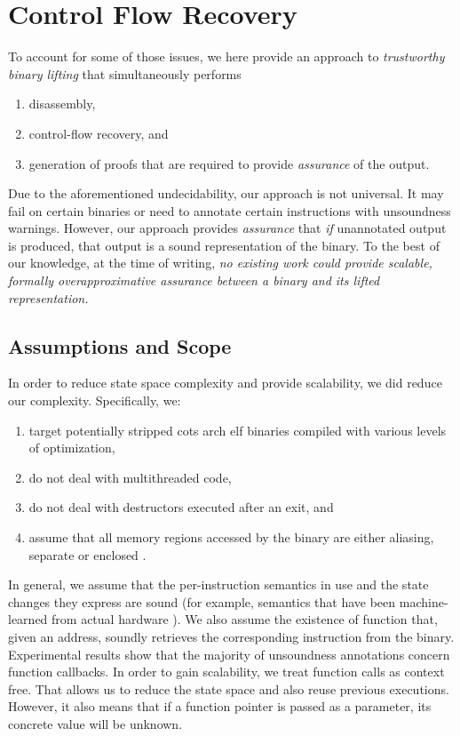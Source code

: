 \section{Control Flow Recovery}
To account for some of those issues, we here provide an approach to \emph{trustworthy binary lifting} that simultaneously performs
\begin{enumerate}
  \item disassembly,
  \item control-flow recovery, and
  \item generation of proofs that are required to provide \emph{assurance} of the output.
\end{enumerate}
Due to the aforementioned undecidability, our approach is not universal.
It may fail on certain binaries or need to annotate certain instructions
with unsoundness warnings.
However, our approach provides \emph{assurance} that \emph{if} unannotated output is produced, that output is a sound representation of the binary.
To the best of our knowledge, at the time of writing,
\emph{no existing work could provide scalable, formally overapproximative
  assurance between a binary and its lifted representation.}

\subsection{Assumptions and Scope}\label{hg-assumptions}
In order to reduce state space complexity and provide scalability, we did reduce our complexity.
Specifically, we:
\begin{enumerate}
  \item target potentially stripped \ac{cots} \gls{arch} \ac{elf} binaries compiled with various levels of optimization,
  \item do not deal with multithreaded code,
  \item do not deal with destructors executed after an exit, and
  \item assume that all memory regions accessed by the binary are either aliasing, separate or enclosed \autocite{balakrishnan2004analyzing,balakrishnan2005codesurfer}.
\end{enumerate}
In general, we assume that the per-instruction semantics in use and the state changes they express are sound
(for example, semantics that have been machine-learned from actual hardware \autocite{heule2016stratified,roessle2019formally}).
We also assume the existence of  function that, given an address, soundly retrieves the corresponding instruction from the binary.
Experimental results show that the majority of unsoundness annotations concern function callbacks.
In order to gain scalability, we treat function calls as context free.
That allows us to reduce the state space and also reuse previous executions.
However, it also means that if a function pointer is passed as a parameter, its concrete value will be unknown.

